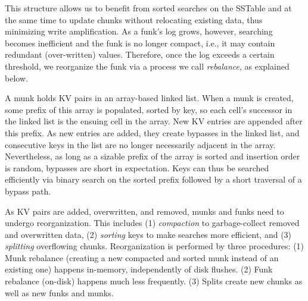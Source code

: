 This structure allows us to benefit from sorted searches on the {SSTable} and at the same time
to update chunks without relocating existing data, thus minimizing write amplification.
As a funk's {log}  grows, however, searching becomes inefficient   and  
the funk is no longer compact, i.e., it may contain redundant (over-written) values.
Therefore, once the {log}  exceeds a certain threshold, we reorganize the funk
via a process we call \emph{rebalance}, as explained below.


A munk holds KV pairs in an array-based linked list.  
When a munk is created, some prefix of this array is populated,
sorted by key, so each cell's successor in the linked list is the ensuing cell in the array.
New KV entries are appended after this prefix.
As new entries are added, they create bypasses in the linked list, and consecutive keys in the
list are no longer necessarily adjacent in the array. Nevertheless, as long as 
a sizable prefix of the  array  is sorted and insertion order is random, bypasses are short in expectation.
Keys can thus be searched efficiently via binary search on the sorted prefix followed by a short traversal 
of a bypass path. %

As KV pairs are added, overwritten, and removed, munks and funks need to undergo reorganization. This includes  
(1) \emph{compaction} to garbage-collect removed and overwritten data, 
(2) \emph{sorting} keys to make searches more efficient,  and
(3) \emph{splitting} overflowing chunks.
Reorganization is performed by three procedures: 
(1) Munk rebalance (creating a new compacted and sorted munk instead of an existing one) 
happens in-memory, independently of disk flushes. 
(2) Funk rebalance (on-disk) happens much less frequently. 
(3) Splits  create new chunks as well as new  funks and munks.


